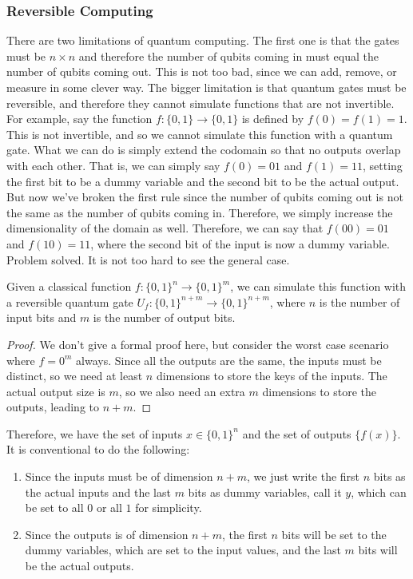 \documentclass{article}
\begin{document}
    \subsubsection{Reversible Computing} 

      There are two limitations of quantum computing. The first one is that the gates must be $n \times n$ and therefore the number of qubits coming in must equal the number of qubits coming out. This is not too bad, since we can add, remove, or measure in some clever way. The bigger limitation is that quantum gates must be reversible, and therefore they cannot simulate functions that are not invertible. For example, say the function $f: \{0, 1\} \longrightarrow \{0, 1\}$ is defined by $f(0) = f(1) = 1$. This is not invertible, and so we cannot simulate this function with a quantum gate. What we can do is simply extend the codomain so that no outputs overlap with each other. That is, we can simply say $f(0) = 01$ and $f(1) = 11$, setting the first bit to be a dummy variable and the second bit to be the actual output. But now we've broken the first rule since the number of qubits coming out is not the same as the number of qubits coming in. Therefore, we simply increase the dimensionality of the domain as well. Therefore, we can say that $f(00) = 01$ and $f(10) = 11$, where the second bit of the input is now a dummy variable. Problem solved. It is not too hard to see the general case. 

      \begin{lemma}
        Given a classical function $f: \{0, 1\}^n \longrightarrow \{0, 1\}^m$, we can simulate this function with a reversible quantum gate $U_f: \{0, 1\}^{n+m} \longrightarrow \{0, 1\}^{n+m}$, where $n$ is the number of input bits and $m$ is the number of output bits.
      \end{lemma}
      \begin{proof} 
        We don't give a formal proof here, but consider the worst case scenario where $f = 0^m$ always. Since all the outputs are the same, the inputs must be distinct, so we need at least $n$ dimensions to store the keys of the inputs. The actual output size is $m$, so we also need an extra $m$ dimensions to store the outputs, leading to $n + m$. 
      \end{proof}

      Therefore, we have the set of inputs $x \in \{0, 1\}^n$ and the set of outputs $\{f(x)\}$. It is conventional to do the following: 
      \begin{enumerate} 
        \item Since the inputs must be of dimension $n+m$, we just write the first $n$ bits as the actual inputs and the last $m$ bits as dummy variables, call it $y$, which can be set to all $0$ or all $1$ for simplicity.  
        \item Since the outputs is of dimension $n+m$, the first $n$ bits will be set to the dummy variables, which are set to the input values, and the last $m$ bits will be the actual outputs. 
      \end{enumerate}
\end{document}
